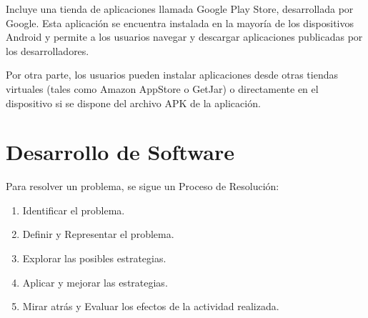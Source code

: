Incluye una tienda de aplicaciones llamada Google Play Store, desarrollada por Google. Esta aplicación se encuentra instalada en la mayoría de los dispositivos Android y permite a los usuarios navegar y descargar aplicaciones publicadas por los desarrolladores.

Por otra parte, los usuarios pueden instalar aplicaciones desde otras tiendas virtuales (tales como Amazon AppStore o GetJar) o directamente en el dispositivo si se dispone del archivo APK de la aplicación.





\section{Desarrollo de Software}

Para resolver un problema, se sigue un Proceso de Resolución:

\begin{enumerate}
    \item Identificar el problema.
    \item Definir y Representar el problema.
    \item Explorar las posibles estrategias.
    \item Aplicar y mejorar las estrategias.
    \item Mirar atrás y Evaluar los efectos de la actividad realizada.
\end{enumerate}

